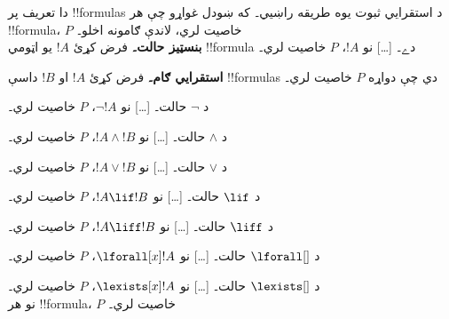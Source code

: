\documentclass[../../../include/open-logic-section]{subfiles}
\begin{document}
\begin{explain}
دا تعريف پر !!{formula}s د استقرايي ثبوت يوه طريقه راښيي۔ که ښودل غواړو چې هر !!{formula}، $P$ خاصيت لري، لاندې ګامونه اخلو۔\\

\textbf{بنسټيز حالت۔} فرض کړئ $!A$ يو اټومي !!{formula} دے۔ [\ldots]
نو $!A$، $P$ خاصيت لري۔

\textbf{استقرايي ګام۔} فرض کړئ $!A$ او $!B$ داسې !!{formula}s دي چې دواړه $P$ خاصيت لري۔

د $\lnot$ حالت۔ [\ldots] نو $\lnot !A$، $P$ خاصيت لري۔

د $\land$ حالت۔ [\ldots] نو $!A \land !B$، $P$ خاصيت لري۔

د $\lor$ حالت۔ [\ldots] نو $!A \lor !B$، $P$ خاصيت لري۔

د $\lif$ حالت۔ [\ldots] نو $!A \lif !B$، $P$ خاصيت لري۔

د $\liff$ حالت۔ [\ldots] نو $!A \liff !B$، $P$ خاصيت لري۔

د $\lforall[]$ حالت۔ [\ldots] نو $\lforall[x] !A$، $P$ خاصيت لري۔

د $\lexists[]$ حالت۔ [\ldots] نو $\lexists[x] !A$، $P$ خاصيت لري۔ \\

نو هر !!{formula}، $P$ خاصيت لري۔
\end{explain}
\end{document}
